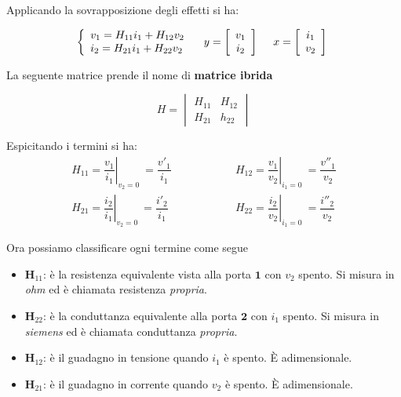 \documentclass[a4paper]{report}
\begin{document}
Applicando la sovrapposizione degli effetti si ha:

\[
\left\{
\begin{array}{l l}
  v_1=H_{11}i_1+H_{12}v_2\\
  i_2=H_{21}i_1+H_{22}v_2
\end{array}\right. \quad
y=\left[
  \begin{array}{c}
    v_1\\
    i_2
  \end{array}\right]\ \quad
x=\left[
  \begin{array}{c}
    i_1\\
    v_2
  \end{array}\right]\
\]

La seguente matrice prende il nome di {\bf matrice ibrida}

\[
H=
\begin{vmatrix}
  H_{11} & H_{12}\\
  H_{21} & h_{22}
\end{vmatrix}
\]

Espicitando i termini si ha:
\[
\begin{matrix}
  H_{11}=\left. \dfrac{v_1}{i_1}\right|_{v_2=0} \ =\dfrac{v'_1}{i_1} &
  \quad \quad \quad \quad \quad
  H_{12}=\left. \dfrac{v_1}{v_2}\right|_{i_1=0} \ =\dfrac{v''_1}{v_2}\\[.5cm]
  H_{21}=\left. \dfrac{i_2}{i_1}\right|_{v_2=0} \ =\dfrac{i'_2}{i_1} &
  \quad \quad \quad \quad \quad
  H_{22}=\left. \dfrac{i_2}{v_2}\right|_{i_1=0} \ =\dfrac{i''_2}{v_2}
\end{matrix}
\]

Ora possiamo classificare ogni termine come segue

\begin{itemize}
\item $\mathbf H_{11}$: \`e la resistenza equivalente vista alla porta
  $\mathbf{1}$ con $v_2$ spento. Si misura in \emph{ohm} ed \`e
  chiamata resistenza \emph{propria}.
\item $\mathbf H_{22}$: \`e la conduttanza equivalente alla porta
  $\mathbf{2}$ con $i_1$ spento. Si misura in \emph{siemens} ed \`e
  chiamata conduttanza \emph{propria}. 
\item $\mathbf H_{12}$: \`e il guadagno in tensione quando $i_1$ \`e
  spento. \`E adimensionale.
\item $\mathbf H_{21}$: \`e il guadagno in corrente quando $v_2$ \`e
  spento. \`E adimensionale.
\end{itemize}
\end{document}
